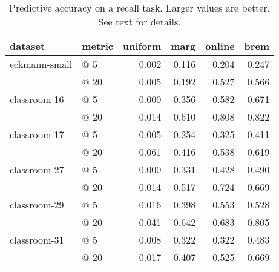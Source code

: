 \begin{table}[t]
\begin{center}
{\footnotesize
\begin{tabular}{llrrrr}
  \hline
dataset & metric & uniform & marg & online & brem \\ 
  \hline
eckmann-small & @  5 & 0.002 & 0.116 & 0.204 & 0.247 \\ 
   & @ 20 & 0.005 & 0.192 & 0.527 & 0.566 \\ 
  classroom-16 & @  5 & 0.000 & 0.356 & 0.582 & 0.671 \\ 
   & @ 20 & 0.014 & 0.610 & 0.808 & 0.822 \\ 
  classroom-17 & @  5 & 0.005 & 0.254 & 0.325 & 0.411 \\ 
   & @ 20 & 0.061 & 0.416 & 0.538 & 0.619 \\ 
  classroom-27 & @  5 & 0.000 & 0.331 & 0.428 & 0.490 \\ 
   & @ 20 & 0.014 & 0.517 & 0.724 & 0.669 \\ 
  classroom-29 & @  5 & 0.016 & 0.398 & 0.553 & 0.528 \\ 
   & @ 20 & 0.041 & 0.642 & 0.683 & 0.805 \\ 
  classroom-31 & @  5 & 0.008 & 0.322 & 0.322 & 0.483 \\ 
   & @ 20 & 0.017 & 0.407 & 0.525 & 0.669 \\ 
   \hline
\end{tabular}
}
\caption{Predictive accuracy on a recall task.  Larger values are better.  See text for details.}
\label{tab:results}
\end{center}
\end{table}
